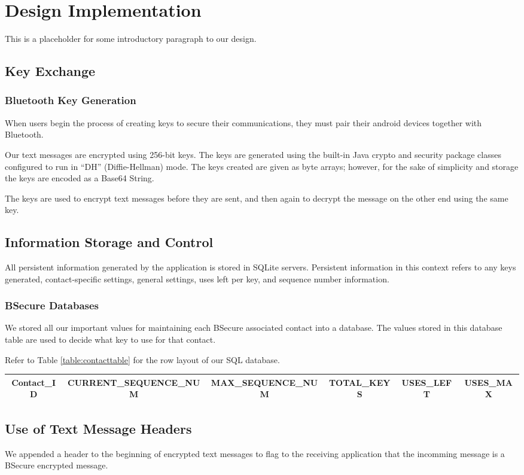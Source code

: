 \section{Design Implementation}
This is a placeholder for some introductory paragraph to our design.

\subsection{Key Exchange}

\subsubsection{Bluetooth Key Generation}
When users begin the process of creating keys to secure their communications, they must pair their android devices together with Bluetooth.

Our text messages are encrypted using 256-bit keys. The keys are generated using the built-in Java crypto and security package classes configured to run in
``DH'' (Diffie-Hellman) mode. The keys created are given as byte arrays; however, for the sake of simplicity and storage the keys are encoded as a Base64 String.

The keys are used to encrypt text messages before they are sent, and then again to decrypt the message on the other end using the same key.
\subsection{Information Storage and Control}

All persistent information generated by the application is stored in SQLite servers. Persistent information in this context refers to any keys generated, contact-specific settings, general settings, uses left per key, and sequence number information.


\subsubsection{BSecure Databases}
We stored all our important values for maintaining each BSecure associated contact
into a database. The values stored in this database table are used to decide what key to use for that
contact.

Refer to Table \ref{table:contacttable} for the row layout of our SQL database.

\begin{table*}
\centering
\caption{Contact Table Design}
\label{table:contacttable}
\begin{tabular}{|c|c|c|c|c|c|} \hline
Contact\_ID&CURRENT\_SEQUENCE\_NUM&MAX\_SEQUENCE\_NUM&TOTAL\_KEYS&USES\_LEFT&USES\_MAX\\ \hline\end{tabular}
\end{table*}

\subsection{Use of Text Message Headers}
We appended a header to the beginning of encrypted text messages to flag to the receiving application that
the incomming message is a BSecure encrypted message.